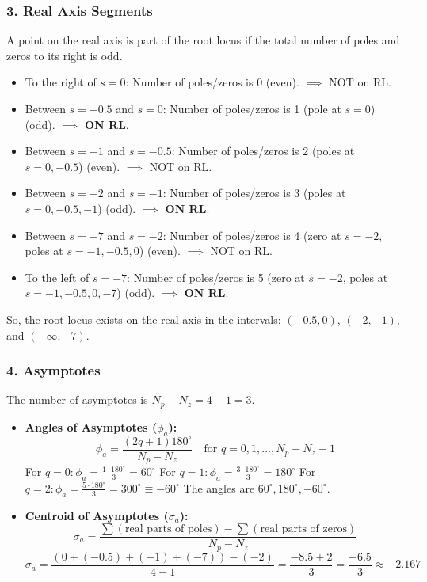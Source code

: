 \documentclass{article}
\begin{document}
	\subsubsection*{3. Real Axis Segments}
	A point on the real axis is part of the root locus if the total number of poles and zeros to its right is odd.
	\begin{itemize}
		\item To the right of $s=0$: Number of poles/zeros is 0 (even). $\implies$ NOT on RL.
		\item Between $s=-0.5$ and $s=0$: Number of poles/zeros is 1 (pole at $s=0$) (odd). $\implies$ \textbf{ON RL}.
		\item Between $s=-1$ and $s=-0.5$: Number of poles/zeros is 2 (poles at $s=0, -0.5$) (even). $\implies$ NOT on RL.
		\item Between $s=-2$ and $s=-1$: Number of poles/zeros is 3 (poles at $s=0, -0.5, -1$) (odd). $\implies$ \textbf{ON RL}.
		\item Between $s=-7$ and $s=-2$: Number of poles/zeros is 4 (zero at $s=-2$, poles at $s=-1, -0.5, 0$) (even). $\implies$ NOT on RL.
		\item To the left of $s=-7$: Number of poles/zeros is 5 (zero at $s=-2$, poles at $s=-1, -0.5, 0, -7$) (odd). $\implies$ \textbf{ON RL}.
	\end{itemize}
	So, the root locus exists on the real axis in the intervals: $(-0.5, 0)$, $(-2, -1)$, and $(-\infty, -7)$.
	
	\subsubsection*{4. Asymptotes}
	The number of asymptotes is $N_p - N_z = 4 - 1 = 3$.
	\begin{itemize}
		\item \textbf{Angles of Asymptotes ($\phi_a$):}
		$$ \phi_a = \frac{(2q+1)180^\circ}{N_p - N_z} \quad \text{for } q = 0, 1, \dots, N_p-N_z-1 $$
		For $q=0: \phi_a = \frac{1 \cdot 180^\circ}{3} = 60^\circ$
		For $q=1: \phi_a = \frac{3 \cdot 180^\circ}{3} = 180^\circ$
		For $q=2: \phi_a = \frac{5 \cdot 180^\circ}{3} = 300^\circ \equiv -60^\circ$
		The angles are $60^\circ, 180^\circ, -60^\circ$.
		
		\item \textbf{Centroid of Asymptotes ($\sigma_a$):}
		$$ \sigma_a = \frac{\sum (\text{real parts of poles}) - \sum (\text{real parts of zeros})}{N_p - N_z} $$
		$$ \sigma_a = \frac{(0 + (-0.5) + (-1) + (-7)) - (-2)}{4 - 1} = \frac{-8.5 + 2}{3} = \frac{-6.5}{3} \approx -2.167 $$
	\end{itemize}
	
\end{document}
